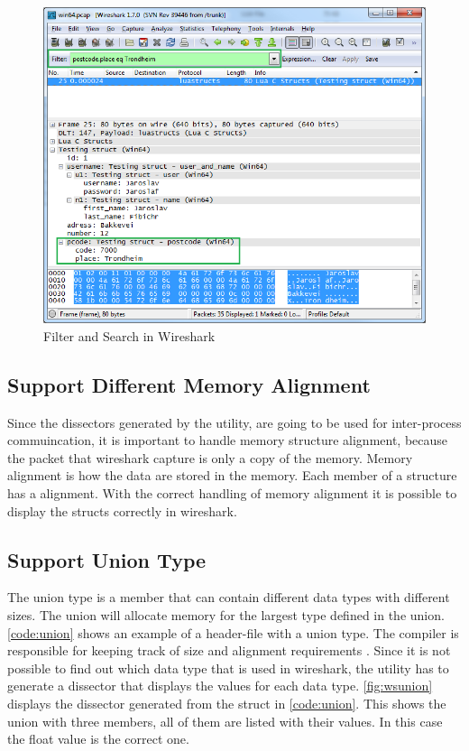 \begin{figure}[ht]
	\center
	\includegraphics[width=\textwidth]{./sprints/img/wireshark_filter}
	\caption{Filter and Search in Wireshark\label{fig:wsfilter}}
\end{figure}

\subsection{Support Different Memory Alignment}
Since the \glspl{dissector} generated by the \gls{utility}, are going to be used for 
inter-process commuincation, it is important to handle memory structure 
alignment, because the \gls{packet} that \Gls{wireshark} capture is only a copy of the 
memory. Memory alignment is how the data are stored in the memory. Each \gls{member} 
of a structure has a alignment. With the correct handling of memory alignment it is 
possible to display the \glspl{struct} correctly in \Gls{wireshark}.

\subsection{Support Union Type}
The \gls{union} type is a \gls{member} that can contain different data types with 
different sizes. The \gls{union} will allocate memory for the largest type defined 
in the \gls{union}. \autoref{code:union} shows an example of a \gls{header}-file with a 
\gls{union} type. The compiler is responsible for keeping track of size and 
alignment requirements\cite[p.147]{Kerninghan1988} . Since it is not 
possible to find out which data type that is used in \Gls{wireshark}, the \gls{utility} 
has to generate a \gls{dissector} that displays the values for each data type. 
\autoref{fig:wsunion} displays the \gls{dissector} generated from the \gls{struct} in 
\autoref{code:union}. This shows the \gls{union} with three \glspl{member}, all of them are 
listed with their values. In this case the \gls{float} value is the correct one.

